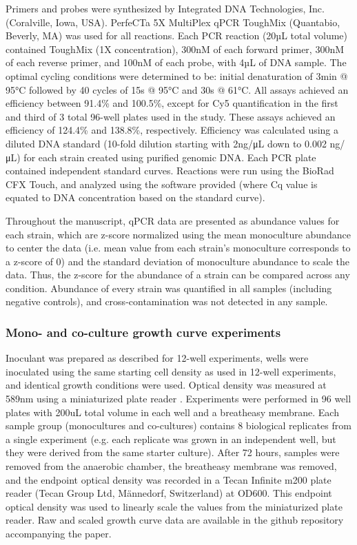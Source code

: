 \documentclass[11pt,twocolumn,notitlepage,openany,twoside]{book}
\begin{document}
\begin{refsection}
Primers and probes were synthesized by Integrated DNA Technologies, Inc. (Coralville, Iowa, USA). PerfeCTa 5X MultiPlex qPCR ToughMix (Quantabio, Beverly, MA) was used for all reactions. Each PCR reaction (20µL total volume) contained ToughMix (1X concentration), 300nM of each forward primer, 300nM of each reverse primer, and 100nM of each probe, with 4µL of DNA sample. The optimal cycling conditions were determined to be: initial denaturation of 3min @ 95°C followed by 40 cycles of 15s @  95°C and 30s @  61°C. All assays achieved an efficiency between 91.4\% and 100.5\%, except for Cy5 quantification in the first and third of 3 total 96-well plates used in the study. These assays achieved an efficiency of 124.4\% and 138.8\%, respectively. Efficiency was calculated using a diluted DNA standard (10-fold dilution starting with 2ng/μL down to 0.002 ng/μL) for each strain created using purified genomic DNA. Each PCR plate contained independent standard curves. Reactions were run using the BioRad CFX Touch, and analyzed using the software provided (where Cq value is equated to DNA concentration based on the standard curve).

Throughout the manuscript, qPCR data are presented as abundance values for each strain, which are z-score normalized using the mean monoculture abundance to center the data (i.e. mean value from each strain’s monoculture corresponds to a z-score of 0) and the standard deviation of monoculture abundance to scale the data. Thus, the z-score for the abundance of a strain can be compared across any condition. Abundance of every strain was quantified in all samples (including negative controls), and cross-contamination was not detected in any sample.

\subsubsection{Mono- and co-culture growth curve experiments}

Inoculant was prepared as described for 12-well experiments, wells were inoculated using the same starting cell density as used in 12-well experiments, and identical growth conditions were used. Optical density was measured at 589nm using a miniaturized plate reader \cite{Jensen2015-mw}. Experiments were performed in 96 well plates with 200uL total volume in each well and a breatheasy membrane. Each sample group (monocultures and co-cultures) contains 8 biological replicates from a single experiment (e.g. each replicate was grown in an independent well, but they were derived from the same starter culture). After 72 hours, samples were removed from the anaerobic chamber, the breatheasy membrane was removed, and the endpoint optical density was recorded in a Tecan Infinite m200 plate reader (Tecan Group Ltd, Männedorf, Switzerland) at OD600. This endpoint optical density was used to linearly scale the values from the miniaturized plate reader. Raw and scaled growth curve data are available in the github repository accompanying the paper.


\end{refsection}
\end{document}
